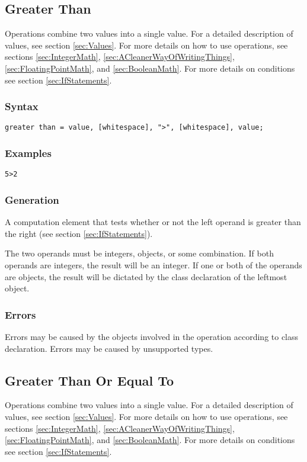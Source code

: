\documentclass[10pt,a4paper]{article}
\begin{document}
\newpage




\subsection{Greater Than}
Operations combine two values into a single value. For a detailed description of values, see section \ref{sec:Values}. For more details on how to use operations, see sections \ref{sec:IntegerMath}, \ref{sec:ACleanerWayOfWritingThings}, \ref{sec:FloatingPointMath}, and \ref{sec:BooleanMath}. For more details on conditions see section \ref{sec:IfStatements}.

\subsubsection{Syntax}
\begin{verbatim}
greater than = value, [whitespace], ">", [whitespace], value;
\end{verbatim}

\subsubsection{Examples}
\begin{verbatim}
5>2
\end{verbatim}

\subsubsection{Generation}
A computation element that tests whether or not the left operand is greater than the right (see section \ref{sec:IfStatements}).

The two operands must be integers, objects, or some combination. If both operands are integers, the result will be an integer. If one or both of the operands are objects, the result will be dictated by the class declaration of the leftmost object.

\subsubsection{Errors}
Errors may be caused by the objects involved in the operation according to class declaration. Errors may be caused by unsupported types.

\newpage




\subsection{Greater Than Or Equal To}
Operations combine two values into a single value. For a detailed description of values, see section \ref{sec:Values}. For more details on how to use operations, see sections \ref{sec:IntegerMath}, \ref{sec:ACleanerWayOfWritingThings}, \ref{sec:FloatingPointMath}, and \ref{sec:BooleanMath}. For more details on conditions see section \ref{sec:IfStatements}.
\end{document}
